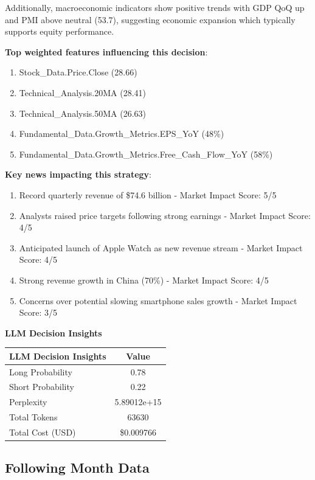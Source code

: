 \documentclass[8pt]{scrartcl}
\begin{document}
Additionally, macroeconomic indicators show positive trends with GDP QoQ up and PMI above neutral (53.7), suggesting economic expansion which typically supports equity performance.

\textbf{Top weighted features influencing this decision}:
\begin{enumerate}
    \item Stock\_Data.Price.Close (28.66)
    \item Technical\_Analysis.20MA (28.41)
    \item Technical\_Analysis.50MA (26.63)
    \item Fundamental\_Data.Growth\_Metrics.EPS\_YoY (48\%)
    \item Fundamental\_Data.Growth\_Metrics.Free\_Cash\_Flow\_YoY (58\%)
\end{enumerate}

\textbf{Key news impacting this strategy}:
\begin{enumerate}
    \item Record quarterly revenue of \$74.6 billion - Market Impact Score: 5/5
    \item Analysts raised price targets following strong earnings - Market Impact Score: 4/5
    \item Anticipated launch of Apple Watch as new revenue stream - Market Impact Score: 4/5
    \item Strong revenue growth in China (70\%) - Market Impact Score: 4/5
    \item Concerns over potential slowing smartphone sales growth - Market Impact Score: 3/5
\end{enumerate}

\textbf{LLM Decision Insights}

\begin{longtable}{l c}
\toprule
\textbf{LLM Decision Insights} & \textbf{Value} \\
\midrule
Long Probability & 0.78 \\
Short Probability & 0.22 \\
Perplexity & 5.89012e+15 \\
\midrule
Total Tokens & 63630 \\
Total Cost (USD) & \$0.009766 \\
\bottomrule
\end{longtable}

\subsection*{Following Month Data}
\end{document}
